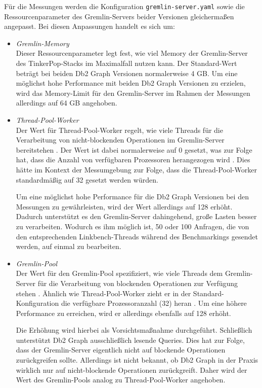 Für die Messungen werden die Konfiguration \texttt{gremlin-server.yaml} sowie die Ressourcenparameter des Gremlin-Servers beider Versionen gleichermaßen angepasst. Bei diesen Anpassungen handelt es sich um:
\begin{itemize}
    \item \textit{Gremlin-Memory}\\
    Dieser Ressourcenparameter legt fest, wie viel Memory der Gremlin-Server des TinkerPop-Stacks im Maximalfall nutzen kann. Der Standard-Wert beträgt bei beiden Db2 Graph Versionen normalerweise 4 GB. Um eine möglichst hohe Performance mit beiden Db2 Graph Versionen zu erzielen, wird das Memory-Limit für den Gremlin-Server im Rahmen der Messungen allerdings auf 64 GB angehoben. 
    \item \textit{Thread-Pool-Worker}\\
    Der Wert für Thread-Pool-Worker regelt, wie viele Threads für die Verarbeitung von nicht-blockenden Operationen im Gremlin-Server bereitstehen \cite{tinkerpop_2020}. Der Wert ist dabei normalerweise auf 0 gesetzt, was zur Folge hat, dass die Anzahl von verfügbaren Prozessoren herangezogen wird \cite{tinkerpop_2020}. Dies hätte im Kontext der Messumgebung zur Folge, dass die Thread-Pool-Worker standardmäßig auf 32 gesetzt werden würden. 
    
    Um eine möglichst hohe Performance für die Db2 Graph Versionen bei den Messungen zu gewährleisten, wird der Wert allerdings auf 128 erhöht. Dadurch unterstützt es den Gremlin-Server dahingehend, große Lasten besser zu verarbeiten. Wodurch es ihm möglich ist, 50 oder 100 Anfragen, die von den entsprechenden Linkbench-Threads während des Benchmarkings gesendet werden, auf einmal zu bearbeiten. 
    \item \textit{Gremlin-Pool}\\
    Der Wert für den Gremlin-Pool spezifiziert, wie viele Threads dem Gremlin-Server für die Verarbeitung von blockenden Operationen zur Verfügung stehen \cite{tinkerpop_2020}. Ähnlich wie Thread-Pool-Worker zieht er in der Standard-Konfiguration die verfügbare Prozessoranzahl (32) heran \cite{tinkerpop_2020}. Um eine höhere Performance zu erreichen, wird er allerdings ebenfalls auf 128 erhöht. 
    
    Die Erhöhung wird hierbei als Vorsichtsmaßnahme durchgeführt. Schließlich unterstützt Db2 Graph ausschließlich lesende Queries. Dies hat zur Folge, dass der Gremlin-Server eigentlich nicht auf blockende Operationen zurückgreifen sollte. Allerdings ist nicht bekannt, ob Db2 Graph in der Praxis wirklich nur auf nicht-blockende Operationen zurückgreift. Daher wird der Wert des Gremlin-Pools analog zu Thread-Pool-Worker angehoben. 
\end{itemize}

